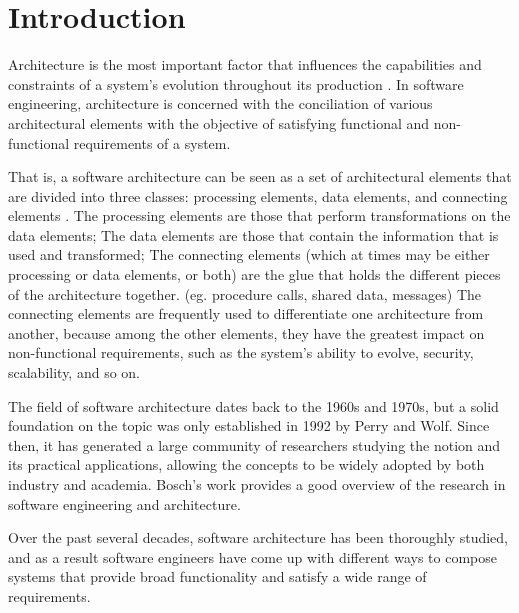 
%

\chapter{Introduction}
\label{cha:introduction}

Architecture is the most important factor that influences the capabilities and constraints of a system's evolution throughout its production \cite{1}.
In software engineering, architecture is concerned with the conciliation of various architectural elements with the objective of satisfying functional and non-functional requirements of a system.

That is, a software architecture can be seen as a set of architectural elements that are divided into three classes: processing elements, data elements, and connecting elements \cite{2}.
The processing elements are those that perform transformations on the data elements;
The data elements are those that contain the information that is used and transformed;
The connecting elements (which at times may be either processing or data elements, or both) are the glue that holds the different pieces of the architecture together.
(eg. procedure calls, shared data, messages)
The connecting elements are frequently used to differentiate one architecture from another,
because among the other elements, they have the greatest impact on non-functional requirements, such as the system's ability to evolve, security, scalability, and so on.

The field of software architecture dates back to the 1960s and 1970s, but a solid foundation on the topic was only established in 1992 by Perry and Wolf.
Since then, it has generated a large community of researchers studying the notion and its practical applications,
allowing the concepts to be widely adopted by both industry and academia.
Bosch's work \cite{3, 4} provides a good overview of the research in software engineering and architecture.

Over the past several decades, software architecture has been thoroughly studied, and as a result software engineers have come up with different ways
to compose systems that provide broad functionality and satisfy a wide range of requirements.

